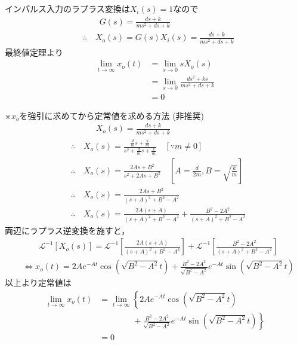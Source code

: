 \documentclass[a4paper,12pt]{article}
\begin{document}
\begin{tcolorbox}[title={7.(3)インパルス入力を印加した際の定常値を求めよ。
    }]
    インパルス入力のラプラス変換は\(X_i(s)=1\)なので
    \vspace{-2mm}
    \begin{align*}
        &\qquad G(s) = \frac{d s + k}{m s^2 + d s + k} \\
        &\therefore \quad X_o(s) = G(s) X_i(s) = \frac{d s + k}{m s^2 + d s + k}
    \end{align*}
    最終値定理より
    \begin{align*}
    \lim_{t \to \infty} x_o(t) &= \lim_{s \to 0} sX_o(s) \\
        &= \lim_{s \to 0} \frac{d s^2 + ks}{m s^2 + d s + k} \\
        &= 0
    \end{align*}
    \begin{tcolorbox}[title={}]
      ※\(x_o\)を強引に求めてから定常値を求める方法 (非推奨)
        \vspace{-2mm}
        \begin{align*}
          &\qquad  \quad X_o(s) = \frac{d s + k}{m s^2 + d s + k}\\
          &\therefore \quad X_o(s) = \frac{\frac{d}{m} s + \frac{k}{m}}{s^2 + \frac{d}{m} s + \frac{k}{m}} \quad \left[\because m \neq 0\right]\\
          &\therefore \quad X_o(s) = \frac{2A s + B^2}{s^2 + 2A s + B^2} \quad \left[A=\frac{d}{2m},B=\sqrt{\frac{k}{m}}\right]\\
          &\therefore \quad X_o(s) = \frac{2A s + B^2}{(s+A)^2+B^2-A^2}\\
          &\therefore \quad X_o(s) = \frac{2A (s+A)}{(s+A)^2+B^2-A^2}
          + \frac{B^2-2A^2}{(s+A)^2+B^2-A^2} 
        \end{align*}
      \quad 両辺にラプラス逆変換を施すと，
        \vspace{-3mm}
        \begin{align*}
        &\qquad \mathcal{L}^{-1} \left[ X_o(s) \right] 
        = \mathcal{L}^{-1} \left[ \frac{2A (s+A)}{(s+A)^2+B^2-A^2}  \right]
        + \mathcal{L}^{-1} \left[ \frac{B^2-2A^2}{(s+A)^2+B^2-A^2}  \right]\\
        &\Leftrightarrow x_o(t) = 2A e^{-At} \cos (\sqrt{B^2-A^2}t) + \frac{B^2-2A^2}{\sqrt{B^2-A^2}} e^{-At} \sin (\sqrt{B^2-A^2}t)
        \end{align*}
        以上より定常値は
        \vspace{-3mm}
        \begin{align*}
        \lim_{t \to \infty} x_o(t) 
            &= \lim_{t \to \infty} \left\{2A e^{-At} \cos (\sqrt{B^2-A^2}t) \right.\\
            &\qquad \qquad + \left.\frac{B^2-2A^2}{\sqrt{B^2-A^2}} e^{-At} \sin (\sqrt{B^2-A^2}t) \right\}\\
            &= 0
        \end{align*}
    \end{tcolorbox}
\end{tcolorbox}
\end{document}
